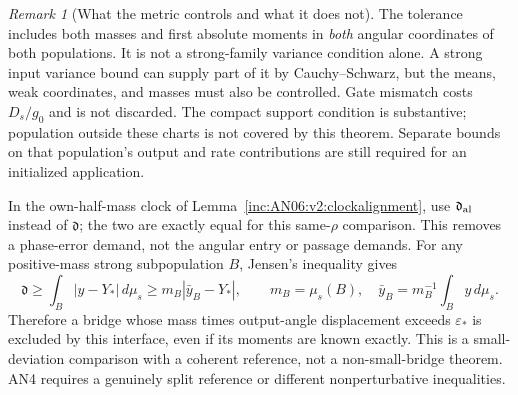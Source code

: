 \documentclass[11pt]{article}
\numberwithin{equation}{section}
\theoremstyle{remark}\newtheorem{remark}[theorem]{Remark}
\newcommand{\1}{\mathbf 1}
\begin{document}
\begin{remark}[What the metric controls and what it does not]
The tolerance includes both masses and first absolute moments in
\emph{both} angular coordinates of both populations. It is not a
strong-family variance condition alone. A strong input variance bound can
supply part of it by Cauchy--Schwarz, but the means, weak coordinates,
and masses must also be controlled. Gate mismatch costs $D_s/g_0$ and is
not discarded. The compact support condition is substantive; population
outside these charts is not covered by this theorem. Separate bounds on
that population's output and rate contributions are still required for
an initialized application.

In the own-half-mass clock of Lemma~\ref{inc:AN06:v2:clockalignment},
use $\mathfrak d_{\rm al}$ instead of $\mathfrak d$; the two are exactly
equal for this same-$\rho$ comparison. This removes a phase-error demand,
not the angular entry or passage demands.
For any positive-mass strong subpopulation $B$, Jensen's inequality gives
\[
 \mathfrak d\ge\int_B|y-Y_*|\,d\mu_s
 \ge m_B|\bar y_B-Y_*|,\qquad
 m_B=\mu_s(B),\quad \bar y_B=m_B^{-1}\int_B y\,d\mu_s.
\]
Therefore a bridge whose mass times output-angle displacement exceeds
$\varepsilon_*$ is excluded by this interface, even if its moments are
known exactly. This is a small-deviation comparison with a coherent
reference, not a non-small-bridge theorem. AN4 requires a genuinely split
reference or different nonperturbative inequalities.
\end{remark}
\end{document}
